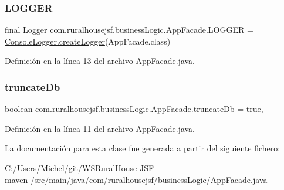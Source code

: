 \mbox{\label{classcom_1_1ruralhousejsf_1_1business_logic_1_1_app_facade_a05d4beab693581eccd0ba740dc222f37}} 
\subsubsection{\texorpdfstring{LOGGER}{LOGGER}}
{\footnotesize\ttfamily final Logger com.\+ruralhousejsf.\+business\+Logic.\+App\+Facade.\+L\+O\+G\+G\+ER = \mbox{\hyperlink{classcom_1_1ruralhousejsf_1_1logger_1_1_console_logger_a520321643663e37d95761134a35505cd}{Console\+Logger.\+create\+Logger}}(App\+Facade.\+class)\hspace{0.3cm}{\ttfamily [static]}}



Definición en la línea 13 del archivo App\+Facade.\+java.

\mbox{\label{classcom_1_1ruralhousejsf_1_1business_logic_1_1_app_facade_ac9cbe77035be5cc1f9bf258c57ca6564}} 
\subsubsection{\texorpdfstring{truncateDb}{truncateDb}}
{\footnotesize\ttfamily boolean com.\+ruralhousejsf.\+business\+Logic.\+App\+Facade.\+truncate\+Db = true\hspace{0.3cm}{\ttfamily [static]}, {\ttfamily [private]}}



Definición en la línea 11 del archivo App\+Facade.\+java.



La documentación para esta clase fue generada a partir del siguiente fichero\+:\begin{DoxyCompactItemize}
\item 
C\+:/\+Users/\+Michel/git/\+W\+S\+Rural\+House-\/\+J\+S\+F-\/maven-\//src/main/java/com/ruralhousejsf/business\+Logic/\mbox{\hyperlink{_app_facade_8java}{App\+Facade.\+java}}\end{DoxyCompactItemize}
